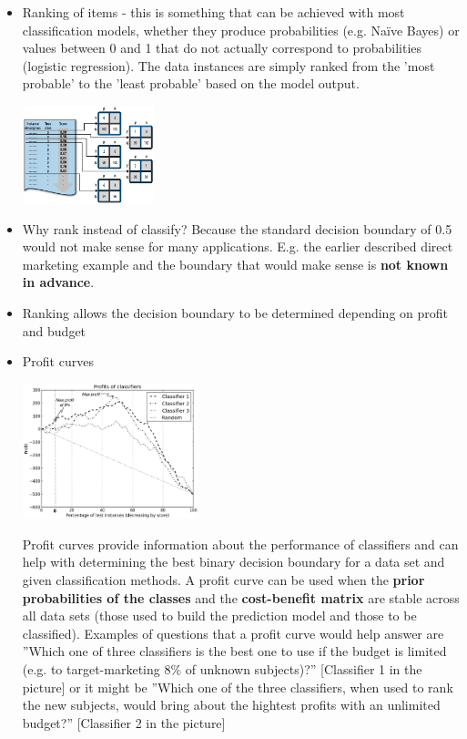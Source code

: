 \newpage


\begin{itemize}
\item Ranking of items - this is something that can be achieved with most classification models, whether they produce probabilities (e.g. Na\"ive Bayes) or values between 0 and 1 that do not actually correspond to probabilities (logistic regression). The data instances are simply ranked from the 'most probable' to the 'least probable' based on the model output.
  
  \begin{center}\includegraphics[width=0.3\textwidth]{8-1_nocap.png}\end{center}

\item Why rank instead of classify? Because the standard decision boundary of 0.5 would not make sense for many applications. E.g. the earlier described direct marketing example and the boundary that would make sense is \textbf{not known in advance}.
\item Ranking allows the decision boundary to be determined depending on profit and budget
\newpage

\item Profit curves 
 
  \includegraphics[width=0.4\textwidth]{8-2_nocap.png}\hspace{0.01\textwidth}
  \parbox[b]{0.54\textwidth}{\small Profit curves provide information about the performance of classifiers and can help with determining the best binary decision boundary for a data set and given classification methods. A profit curve can be used when the \textbf{prior probabilities of the classes} and the \textbf{cost-benefit matrix} are stable across all data sets (those used to build the prediction model and those to be classified). Examples of questions that a profit curve would help answer are ''Which one of three classifiers is the best one to use if the budget is limited (e.g. to target-marketing $8\%$ of unknown subjects)?'' [Classifier 1 in the picture] or it might be ''Which one of the three classifiers, when used to rank the new subjects, would bring about the hightest profits with an unlimited budget?'' [Classifier 2 in the picture]}
  

\end{itemize}
